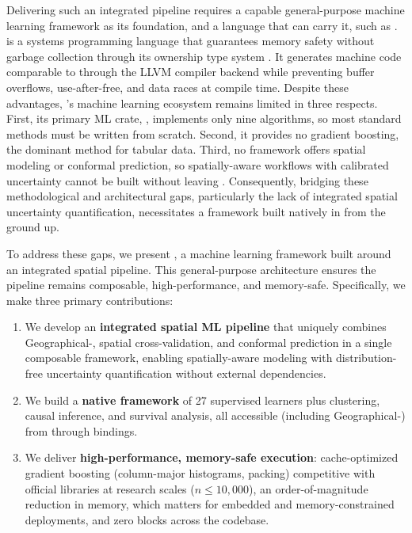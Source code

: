 \documentclass[article]{jss}
\begin{document}
Delivering such an integrated pipeline requires a capable general-purpose
machine learning framework as its foundation, and a language that can carry
it, such as .
 \citep{Rust:2024} is a systems programming language that
guarantees memory safety without garbage collection through its ownership type
system \citep{Matsakis+Klock:2014}. It generates machine code comparable to
 through the LLVM compiler backend while preventing buffer
overflows, use-after-free, and data races at compile time. Despite these
advantages, 's machine learning ecosystem remains limited in
three respects. First, its primary ML crate,  \citep{linfa:2024},
implements only nine algorithms, so most standard methods must be written from
scratch. Second, it provides no gradient boosting, the dominant method for
tabular data. Third, no  framework offers spatial modeling or
conformal prediction, so spatially-aware workflows with calibrated uncertainty
cannot be built without leaving . Consequently, bridging these
methodological and architectural gaps, particularly the lack of integrated
spatial uncertainty quantification, necessitates a framework built natively in
 from the ground up.

To address these gaps, we present , a  machine
learning framework built around an integrated spatial pipeline. This
general-purpose architecture ensures the pipeline remains composable,
high-performance, and memory-safe. Specifically, we make three primary
contributions:

\begin{enumerate}
\item We develop an \textbf{integrated spatial ML pipeline} that uniquely
  combines Geographical-, spatial cross-validation, and conformal
  prediction in a single composable framework, enabling spatially-aware
  modeling with distribution-free uncertainty quantification without external
  dependencies.
\item We build a \textbf{native  framework} of 27 supervised
  learners plus clustering, causal inference, and survival analysis, all
  accessible (including Geographical-) from 
  through  bindings.
\item We deliver \textbf{high-performance, memory-safe execution}:
  cache-optimized gradient boosting (column-major histograms, 
  packing) competitive with official  libraries at research
  scales ($n \leq 10{,}000$), an order-of-magnitude reduction in memory, which
  matters for embedded and memory-constrained deployments, and zero
   blocks across the codebase.
\end{enumerate}
\end{document}

